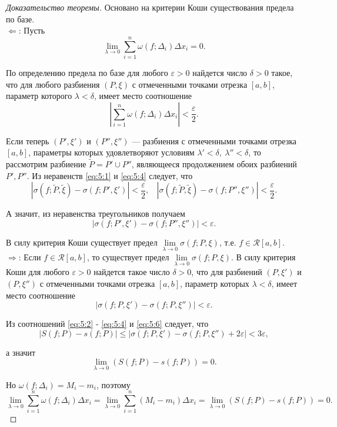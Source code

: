 \documentclass[12pt]{report}
\numberwithin{equation}{section}
\begin{document}
\begin{proof}[Доказательство теоремы] Основано на критерии Коши существования предела по базе.\\

$\Leftarrow$: Пусть
\[ \lim_{\lambda \to 0} \sum_{i=1}^n \omega(f; \Delta_i) \Delta x_i = 0.\]

По определению предела по базе для любого $\varepsilon > 0$ найдется число $\delta > 0$ такое, что для любого разбиения $(P, \xi)$ с отмеченными точками отрезка $[a,b]$, параметр которого $\lambda < \delta$, имеет место соотношение
\begin{equation} \label{eq:5:5}
\left| \sum_{i=1}^n \omega(f; \Delta_i) \Delta x_i\right| < \frac{\varepsilon}{2}.
\end{equation}

Если теперь $(P', \xi')$ и $(P'', \xi'')$  --- разбиения с отмеченными точками отрезка $[a,b]$, параметры которых удовлетворяют условиям $\lambda' < \delta,~ \lambda'' < \delta$, то рассмотрим разбиение $\tilde{P} = P' \cup P''$, являющееся продолжением обоих разбиений $P', P''$. Из неравенств \eqref{eq:5:1} и \eqref{eq:5:4} следует, что
\[ \left|\sigma(f; \tilde{P}, \tilde{\xi}) - \sigma(f; P', \xi') \right| < \frac{\varepsilon}{2}, ~~~~ \left|\sigma(f; \tilde{P}, \tilde{\xi}) - \sigma(f; P'', \xi'')\right| < \frac{\varepsilon}{2}. \]

А значит, из неравенства треугольников получаем
\[ \left| \sigma(f; P', \xi') - \sigma(f; P'', \xi'')\right| < \varepsilon.\]

В силу критерия Коши существует предел $\lim\limits_{\lambda \to 0} \sigma(f; P, \xi)$, т.е. $f \in \mathcal{R}[a,b]$.\\

$\Rightarrow$: Если  $f \in \mathcal{R}[a,b]$, то существует предел  $\lim\limits_{\lambda \to 0} \sigma(f; P, \xi)$. В силу критерия Коши для любого $\varepsilon > 0$ найдется такое число $\delta > 0$, что для разбиений $(P, \xi')$ и $(P, \xi'')$ с отмеченными точками отрезка $[a,b]$, параметр которых $\lambda < \delta$, имеет место соотношение
\begin{equation} \label{eq:5:6}
\left| \sigma(f;P, \xi') - \sigma(f;P, \xi'')\right| < \varepsilon.
\end{equation}


Из соотношений \eqref{eq:5:2} - \eqref{eq:5:4} и \eqref{eq:5:6} следует, что
\[ \left| S(f;P) - s(f;P)\right| \leqslant | \sigma(f;P, \xi') - \sigma(f; P, \xi'') + 2 \varepsilon | < 3 \varepsilon,\]

а значит
\[ \lim_{\lambda \to 0} \left( S(f;P) - s(f;P)\right) = 0.\]

Но $\omega(f;\Delta_i) = M_i - m_i$, поэтому
\[ \lim_{\lambda \to 0} \sum_{i = 1}^n \omega(f; \Delta_i) \Delta x_i =  \lim_{\lambda \to 0} \sum_{i = 1}^n (M_i - m_i) \Delta x_i =\lim_{\lambda \to 0} \left( S(f;P) - s(f;P)\right) = 0.\]
\end{proof}
\end{document}
